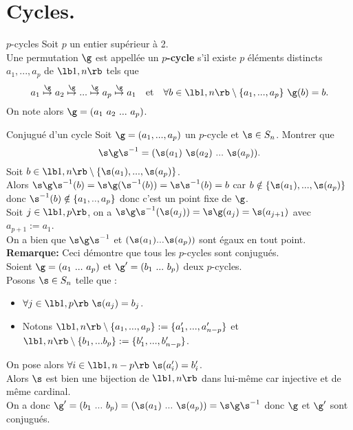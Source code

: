 \documentclass[11pt]{article}
\begin{document}
\section{Cycles.}

\begin{defi}{$p$-cycles}{}
    Soit $p$ un entier supérieur à 2.\\
    Une permutation $\g$ est appellée un $p$\textbf{-cycle} s'il existe $p$ éléments distincts $a_1,...,a_p$ de $\lb1,n\rb$ tels que
    \begin{equation*}
        a_1\overset{\g}{\mapsto}a_2\overset{\g}{\mapsto}...\overset{\g}{\mapsto}a_p\overset{\g}{\mapsto}a_1 \quad \text{et} \quad \forall b \in \lb1,n\rb\setminus\{a_1,...,a_p\} ~ \g(b)=b.
    \end{equation*}
    On note alors $\g=(a_1~a_2~...~a_p)$.
\end{defi}


\begin{ex}{Conjugué d'un cycle}{}
    Soit $\g=(a_1,...,a_p)$ un $p$-cycle et $\s\in S_n$. Montrer que
    \begin{equation*}
        \s\g\s^{-1}=(\s(a_1)~\s(a_2)~...~\s(a_p)).
    \end{equation*}
    \tcblower
    Soit $b\in\lb1,n\rb\setminus\{\s(a_1),...,\s(a_p)\}$.\\
    Alors $\s\g\s^{-1}(b)=\s\g(\s^{-1}(b))=\s\s^{-1}(b)=b$ car $b\notin\{\s(a_1),...,\s(a_p)\}$ donc $\s^{-1}(b)\notin\{a_1,..,a_p\}$ donc c'est un point fixe de $\g$.\\
    Soit $j\in\lb1,p\rb$, on a $\s\g\s^{-1}(\s(a_j))=\s\g(a_j)=\s(a_{j+1})$ avec $a_{p+1}:=a_1$.\\
    On a bien que $\s\g\s^{-1}$ et $(\s(a_1)...\s(a_p))$ sont égaux en tout point.\\
    \textbf{Remarque:} Ceci démontre que tous les $p$-cycles sont conjugués.\\
    Soient $\g=(a_1~...~a_p)$ et $\g'=(b_1~...~b_p)$ deux $p$-cycles.\\
    Posons $\s\in S_n$ telle que :
    \begin{itemize}[topsep=0pt,itemsep=-0.9 ex]
        \item $\forall j \in \lb 1, p \rb ~ \s(a_j) = b_j$.
        \item Notons $\lb 1, n \rb \setminus \{a_1, ..., a_p\} := \{a_1', ..., a_{n-p}'\}$ et $\lb 1, n \rb \setminus \{b_1, ... b_p\} := \{b_1', ... , b_{n-p}'\}$.
    \end{itemize}
    On pose alors $\forall i\in\lb1,n-p\rb ~ \s(a_i')=b_i'$.\\
    Alors $\s$ est bien une bijection de $\lb1,n\rb$ dans lui-même car injective et de même cardinal.\\
    On a donc $\g'=(b_1~...~b_p) = (\s(a_1)~...~\s(a_p))=\s\g\s^{-1}$ donc $\g$ et $\g'$ sont conjugués.
\end{ex}
\end{document}
